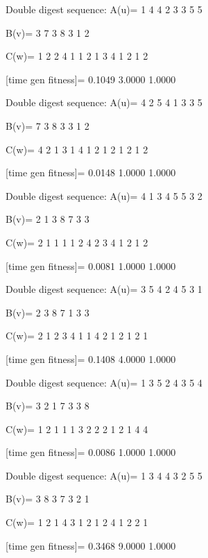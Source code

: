 Double digest sequence:
A(u)=
     1     4     4     2     3     3     5     5

B(v)=
     3     7     3     8     3     1     2

C(w)=
     1     2     2     4     1     1     2     1     3     4     1     2     1     2

[time gen fitness]=
    0.1049    3.0000    1.0000

Double digest sequence:
A(u)=
     4     2     5     4     1     3     3     5

B(v)=
     7     3     8     3     3     1     2

C(w)=
     4     2     1     3     1     4     1     2     1     2     1     2     1     2

[time gen fitness]=
    0.0148    1.0000    1.0000

Double digest sequence:
A(u)=
     4     1     3     4     5     5     3     2

B(v)=
     2     1     3     8     7     3     3

C(w)=
     2     1     1     1     1     2     4     2     3     4     1     2     1     2

[time gen fitness]=
    0.0081    1.0000    1.0000

Double digest sequence:
A(u)=
     3     5     4     2     4     5     3     1

B(v)=
     2     3     8     7     1     3     3

C(w)=
     2     1     2     3     4     1     1     4     2     1     2     1     2     1

[time gen fitness]=
    0.1408    4.0000    1.0000

Double digest sequence:
A(u)=
     1     3     5     2     4     3     5     4

B(v)=
     3     2     1     7     3     3     8

C(w)=
     1     2     1     1     1     3     2     2     2     1     2     1     4     4

[time gen fitness]=
    0.0086    1.0000    1.0000

Double digest sequence:
A(u)=
     1     3     4     4     3     2     5     5

B(v)=
     3     8     3     7     3     2     1

C(w)=
     1     2     1     4     3     1     2     1     2     4     1     2     2     1

[time gen fitness]=
    0.3468    9.0000    1.0000

